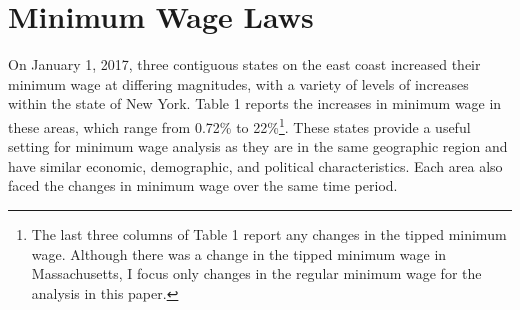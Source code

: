 \documentclass[11pt]{article}
\begin{document}







\section{Minimum Wage Laws}
On January 1, 2017, three contiguous states on the east coast increased their minimum wage at differing magnitudes, with a variety of levels of increases within the state of New York. Table 1 reports the increases in minimum wage in these areas, which range from 0.72\% to 22\%\footnote{The last three columns of Table 1 report any changes in the tipped minimum wage. Although there was a change in the tipped minimum wage in Massachusetts, I focus only changes in the regular minimum wage for the analysis in this paper.}. These states provide a useful setting for minimum wage analysis as they are in the same geographic region and have similar economic, demographic, and political characteristics. Each area also faced the changes in minimum wage over the same time period. 
\end{document}
